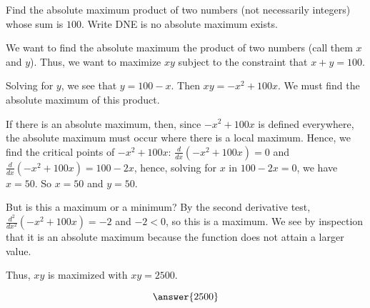 \documentclass{ximera}
\author{Gregory Hartman \and Matthew Carr}
\begin{document}
\begin{exercise}



Find the absolute maximum product of two numbers (not necessarily integers) whose sum is $100$. Write DNE is no absolute maximum exists. 

\begin{hint}
We want to find the absolute maximum the product of two numbers (call them $x$ and $y$). Thus, we want to maximize $xy$ subject to the constraint that $x+y=100$.
\end{hint}
\begin{hint}
Solving for $y$, we see that $y=100-x$. Then $xy=-x^2+100x$. We must find the absolute maximum of this product. 
\end{hint}
\begin{hint}
If there is an absolute maximum, then, since $-x^2+100x$ is defined everywhere, the absolute maximum must occur where there is a local maximum. Hence, we find the critical points of $-x^2+100x$: $\frac{d}{dx}(-x^2+100x)=0$ and $\frac{d}{dx}(-x^2+100x)=100-2x$, hence, solving for $x$ in $100-2x=0$, we have $x=50$. So $x=50$ and $y=50$.

But is this a maximum or a minimum? By the second derivative test, $\frac{d^2}{dx^2}(-x^2+100x)=-2$ and $-2<0$, so this is a maximum. We see by inspection that it is an absolute maximum because the function does not attain a larger value.

Thus, $xy$ is maximized with $xy=2500$. 
\end{hint}
\begin{prompt}
\[
\answer{2500}
\]
\end{prompt}


\end{exercise}
\end{document}
